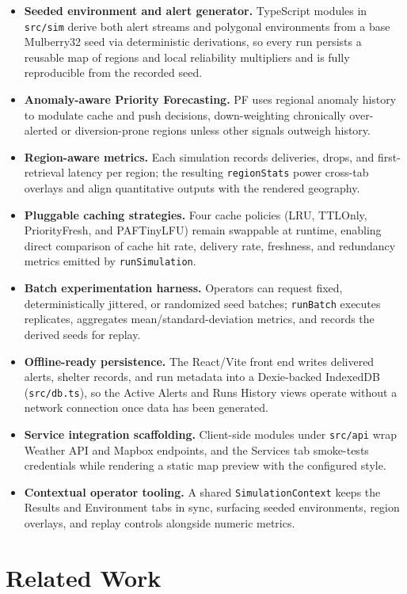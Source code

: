 \begin{itemize}
    \item \textbf{Seeded environment and alert generator.} TypeScript modules in \texttt{src/sim} derive both alert streams and polygonal environments from a base Mulberry32 seed via deterministic derivations, so every run persists a reusable map of regions and local reliability multipliers and is fully reproducible from the recorded seed.
    \item \textbf{Anomaly-aware Priority Forecasting.} PF uses regional anomaly history to modulate cache and push decisions, down-weighting chronically over-alerted or diversion-prone regions unless other signals outweigh history.
    \item \textbf{Region-aware metrics.} Each simulation records deliveries, drops, and first-retrieval latency per region; the resulting \texttt{regionStats} power cross-tab overlays and align quantitative outputs with the rendered geography.
    \item \textbf{Pluggable caching strategies.} Four cache policies (LRU, TTLOnly, PriorityFresh, and PAFTinyLFU) remain swappable at runtime, enabling direct comparison of cache hit rate, delivery rate, freshness, and redundancy metrics emitted by \texttt{runSimulation}.
    \item \textbf{Batch experimentation harness.} Operators can request fixed, deterministically jittered, or randomized seed batches; \texttt{runBatch} executes replicates, aggregates mean/standard-deviation metrics, and records the derived seeds for replay.
    \item \textbf{Offline-ready persistence.} The React/Vite front end writes delivered alerts, shelter records, and run metadata into a Dexie-backed IndexedDB (\texttt{src/db.ts}), so the Active Alerts and Runs History views operate without a network connection once data has been generated.
    \item \textbf{Service integration scaffolding.} Client-side modules under \texttt{src/api} wrap Weather API and Mapbox endpoints, and the Services tab smoke-tests credentials while rendering a static map preview with the configured style.
    \item \textbf{Contextual operator tooling.} A shared \texttt{SimulationContext} keeps the Results and Environment tabs in sync, surfacing seeded environments, region overlays, and replay controls alongside numeric metrics.
\end{itemize}

\section{Related Work}

